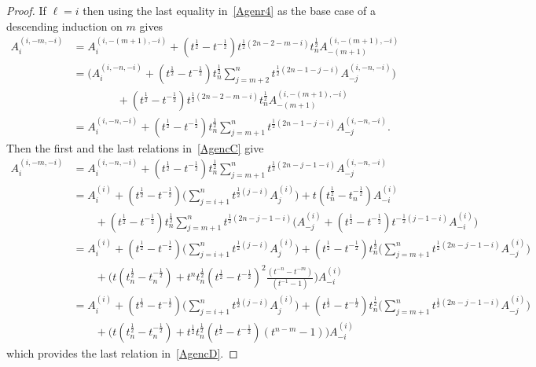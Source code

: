 \documentclass[11pt]{article}
\theoremstyle{plain}
\theoremstyle{definition}
\theoremstyle{remark}
\numberwithin{equation}{section}
\newcounter{r}
\newcounter{s}
\begin{document}
\begin{proof}
\noindent
If $\ell=i$ then using the last equality in~\eqref{Agenr4} as the base case of 
a descending induction on $m$ gives
\begin{align*}
A^{(i,-m,-i)}_i
&= A^{(i,-(m+1),-i)}_i  
+(t^{\frac12}-t^{-\frac12})t^{\frac12(2n-2-m-i)}t_n^{\frac12} A^{(i,-(m+1),-i)}_{-(m+1)}  \\
&= \Big(A^{(i,-n,-i)}_i+(t^{\frac12}-t^{-\frac12})t_n^{\frac12} \sum_{j=m+2}^n t^{\frac12(2n-1-j-i)} A^{(i,-n,-i)}_{-j}\Big)
\\
&\qquad\qquad
+(t^{\frac12}-t^{-\frac12})t^{\frac12(2n-2-m-i)}t_n^{\frac12} A^{(i,-(m+1),-i)}_{-(m+1)}  \\
&= A^{(i,-n,-i)}_i+(t^{\frac12}-t^{-\frac12})t_n^{\frac12} \sum_{j=m+1}^n t^{\frac12(2n-1-j-i)} A^{(i,-n,-i)}_{-j}.
\end{align*}
Then the first and the last relations in~\eqref{AgencC} give
\begin{align*}
A^{(i,-m,-i)}_i 
&= A^{(i,-n,-i)}_i
+ (t^{\frac12} - t^{-\frac12})t_n^{\frac12} \sum_{j=m+1}^n t^{\frac12(2n-j-1-i)} A^{(i,-n,-i)}_{-j} 
\\
&= A^{(i)}_i +  (t^{\frac12}-t^{-\frac12})
\Big(\sum_{j=i+1}^n t^{\frac12(j-i)} A^{(i)}_j\Big) + t(t_n^{\frac12}-t_n^{-\frac12}) A^{(i)}_{-i} 
\\
&\qquad + (t^{\frac12} - t^{-\frac12})t_n^{\frac12} \sum_{j=m+1}^n t^{\frac12(2n-j-1-i)} 
\big( A^{(i)}_{-j} + (t^{\frac12}-t^{-\frac{1}{2}})t^{-\frac{1}{2}(j-1-i)}A^{(i)}_{-i}\big)
\\
&= A^{(i)}_i +  (t^{\frac12}-t^{-\frac12})
\Big(\sum_{j=i+1}^n t^{\frac12(j-i)} A^{(i)}_j\Big) 
+ (t^{\frac12} - t^{-\frac12})t_n^{\frac12} \Big(\sum_{j=m+1}^n t^{\frac12(2n-j-1-i)} A^{(i)}_{-j}\Big)
\\
&\qquad + \Big(
t(t_n^{\frac12}-t_n^{-\frac12}) + t^n t_n^{\frac12}(t^{\frac12}-t^{-\frac12})^2 \frac{(t^{-n}-t^{-m})}{(t^{-1}-1)}\Big) A^{(i)}_{-i} 
\\
&= A^{(i)}_i +  (t^{\frac12}-t^{-\frac12})
\Big(\sum_{j=i+1}^n t^{\frac12(j-i)} A^{(i)}_j\Big) 
+ (t^{\frac12} - t^{-\frac12})t_n^{\frac12} \Big(\sum_{j=m+1}^n t^{\frac12(2n-j-1-i)} A^{(i)}_{-j}\Big)
\\
&\qquad + \Big(
t(t_n^{\frac12}-t_n^{-\frac12}) + t^{\frac12}t_n^{\frac12}(t^{\frac12}-t^{-\frac12}) (t^{n-m}-1)\Big) A^{(i)}_{-i} 
\end{align*}
which provides the last relation in~\eqref{AgencD}.
\end{proof}
\end{document}
